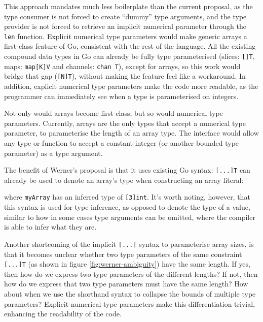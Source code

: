 
This approach mandates much less boilerplate than the current proposal, as the
type consumer is not forced to create ``dummy'' type arguments, and the type
provider is not forced to retrieve an implicit numerical parameter through the
\texttt{len} function. Explicit numerical type parameters would make generic
arrays a first-class feature of Go, consistent with the rest of the language.
All the existing compound data types in Go can already be fully type
parameterised (slices: \texttt{[]T}, maps: \texttt{map[K]V} and channels:
\texttt{chan T}), except for arrays, so this work would bridge that gap
(\texttt{[N]T}), without making the feature feel like a workaround. In addition,
explicit numerical type parameters make the code more readable, as the
programmer can immediately see when a type is parameterised on integers.

Not only would arrays become first class, but so would numerical type
parameters. Currently, arrays are the only types that accept a numerical type
parameter, to parameterise the length of an array type. The  interface
would allow any type or function to accept a constant integer (or another
 bounded type parameter) as a type argument.

The benefit of Werner's proposal is that it uses existing Go syntax:
\texttt{[...]T} can already be used to denote an array's type when constructing
an array literal:


where \texttt{myArray} has an inferred type of \texttt{[3]int}. It's worth
noting, however, that this syntax is used for type inference, as opposed to
denote the type of a value, similar to how in some cases type arguments can be
omitted, where the compiler is able to infer what they are.

Another shortcoming of the implicit \texttt{[...]} syntax to parameterise array
sizes, is that it becomes unclear whether two type parameters of the same
constraint \texttt{[...]T} (as shown in figure \ref{fig:werner-ambiguity}) have
the same length. If yes, then how do we express two type parameters of the
different lengths? If not, then how do we express that two type parameters must
have the same length? How about when we use the shorthand syntax to collapse the
bounds of multiple type parameters? Explicit numerical type parameters make this
differentiation trivial, enhancing the readability of the code.

